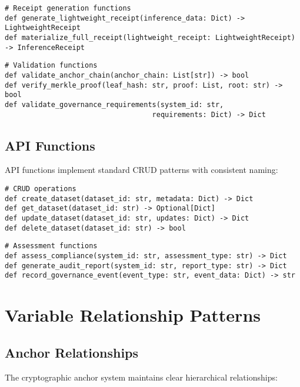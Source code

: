 \documentclass[12pt,a4paper]{article}
\begin{document}
\begin{lstlisting}[caption=Receipt Generation Functions]
# Receipt generation functions
def generate_lightweight_receipt(inference_data: Dict) -> LightweightReceipt
def materialize_full_receipt(lightweight_receipt: LightweightReceipt) -> InferenceReceipt
\end{lstlisting}

\begin{lstlisting}[caption=Validation Functions]
# Validation functions
def validate_anchor_chain(anchor_chain: List[str]) -> bool
def verify_merkle_proof(leaf_hash: str, proof: List, root: str) -> bool
def validate_governance_requirements(system_id: str, 
                                   requirements: Dict) -> Dict
\end{lstlisting}

\subsection{API Functions}

API functions implement standard CRUD patterns with consistent naming:

\begin{lstlisting}[caption=CRUD Operations]
# CRUD operations
def create_dataset(dataset_id: str, metadata: Dict) -> Dict
def get_dataset(dataset_id: str) -> Optional[Dict]
def update_dataset(dataset_id: str, updates: Dict) -> Dict
def delete_dataset(dataset_id: str) -> bool
\end{lstlisting}

\begin{lstlisting}[caption=Assessment Functions]
# Assessment functions
def assess_compliance(system_id: str, assessment_type: str) -> Dict
def generate_audit_report(system_id: str, report_type: str) -> Dict
def record_governance_event(event_type: str, event_data: Dict) -> str
\end{lstlisting}

\section{Variable Relationship Patterns}

\subsection{Anchor Relationships}

The cryptographic anchor system maintains clear hierarchical relationships:
\end{document}
